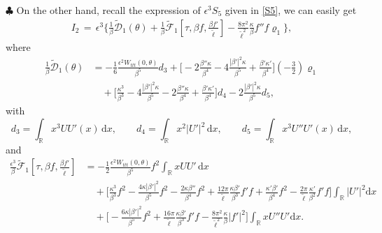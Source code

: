 \documentclass[10pt, reqno]{amsart}
\numberwithin{equation}{section}
\theoremstyle{definition}
\begin{document}
{\smallskip\noindent$\clubsuit$
 On the other hand, recall the expression of $\epsilon^3 S_{5}$ given in \eqref{S5}, we can easily get
\begin{align} \label{bar S31+bar S51intergralUx}
I_2\,=\,
\epsilon^3\Bigg\{ \frac1{\beta}\tilde{\mathcal D}_1(\theta)
+\frac1{\beta}\tilde{\mathcal F}_1\left[\tau, \beta f, \frac{\beta {f}'}{\tilde\ell}\right]
- \frac{8\pi^2}{{\tilde\ell}^2}\frac{\kappa}{\beta} f''f \varrho_1 \Bigg\},
\end{align}
 where
\begin{align*}
\frac1{\beta}\tilde{\mathcal D}_1(\theta)
& = - \frac{1}{6} \frac{ \epsilon^2W_{ttt}(0, \theta)}{\beta^5}d_3 + \Big[ -2 \frac{\beta''\kappa}{\beta^4} -4\frac{|\beta'|^2\kappa}{\beta^5} +\frac{\beta' \kappa'} {\beta^4} \Big](-\frac 32)\varrho_1
\nonumber\\[2mm]
 & \quad
 + \Big[ \frac{\kappa^3}{\beta^3}-4\frac{|\beta'|^2\kappa}{\beta^5}-2\frac{\beta''\kappa}{\beta^4} + \frac{\beta' \kappa'} {\beta^4} \Big]d_4 -2 \frac{|\beta'|^2\kappa}{\beta^5}d_5,
\end{align*}
with
\[ d_3 = \int_{\mathbb R} x^3 U U'(x) \,{\mathrm d}x,\qquad d_4 = \int_{\mathbb R} x^2|U'|^2 \,{\mathrm d}x, \qquad d_5= \int_{\mathbb R} x^3 U'' U'(x) \,{\mathrm d}x, \]
and
\begin{align*}
 \frac{ \epsilon^3}{\beta}\tilde{\mathcal F}_1\left[\tau, \beta f, \frac{\beta {f}'}{\tilde\ell}\right]
 & = - \frac{1}{2} \frac{\epsilon^2 W_{ttt}(0, \theta)}{\beta^5}f^2 \int_{\mathbb R} x UU' \,{\mathrm d}x
\nonumber\\[2mm]
 & \quad +
 \Big[
 \frac{\kappa^3}{\beta^3}f^2
 -\frac{4\kappa|\beta'|^2}{\beta^5} f^2
 - \frac{2\kappa\beta''}{\beta^4}f^2
 +\frac{12\pi }{ {\tilde\ell}}\frac{\kappa\beta'}{\beta^3} f' f
 + \frac{\kappa'\beta'} {\beta^4}f^2
 - \frac{2\pi}{{\tilde\ell}} \frac{\kappa'}{\beta^2} f'f\Big]\int_{\mathbb R}|U'|^2 {\mathrm d}x\nonumber\\[2mm]
 & \quad +
 \Big[ -\frac{6\kappa|\beta'|^2}{\beta^5}f^2
 + \frac{16\pi}{ {\tilde\ell}} \frac{\kappa\beta'}{\beta^3} f' f
-\frac{8\pi^2} {{\tilde\ell}^2}\frac{\kappa}{\beta} |f'|^2\Big]\int_{\mathbb R} x U'' U'{\mathrm d}x.
\end{align*}



}
\end{document}
